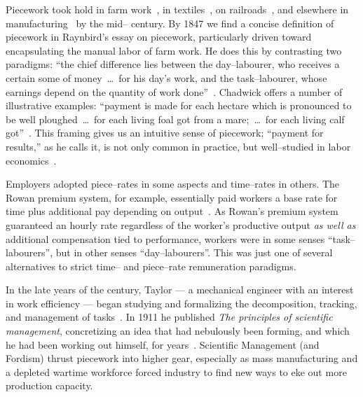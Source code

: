 \documentclass[pn4226]{subfiles}
\begin{document}
Piecework took hold in farm work~\cite{hughRaynbirdTaskWork}, %
in textiles~\cite{restructuringPieceworkBaker,riisOtherSideLives},
on railroads~\cite{Brown01041990}, and 
elsewhere in manufacturing~\cite{10.2307/3827491} by the mid-- century.
By 1847 we find
a concise definition of piecework
in Raynbird's essay on piecework,
particularly driven toward encapsulating the manual labor of farm work.
He does this by contrasting two paradigms:
``the chief difference lies between the day--labourer,
who receives a certain some of money~\dots~for his day's work,
and the task--labourer, whose earnings depend on the quantity of work done''~\cite{hughRaynbirdTaskWork}.
Chadwick offers a number of illustrative examples:
``payment is made for each hectare which is pronounced to be well ploughed~\dots~for each living foal got from a mare;~\dots~for each living calf got''~\cite{10.2307/2338394}.
This framing gives us an intuitive sense of piecework;
``payment for results,'' as he calls it,
is not only common in practice, but
well--studied in labor economics~\cite{Figlio2007901,weitzman1976new,10.2307/3003414,BJIR:BJIR038}.

Employers adopted piece--rates in some aspects and
time--rates in others.
The Rowan premium system, for example,
essentially paid workers
a base rate for time plus
additional pay depending on output~\cite{rowan1901premium}.
As Rowan's premium system guaranteed an hourly rate
regardless of the worker's productive output
\textit{as well as} additional compensation tied to performance,
workers were
in some senses ``task--labourers'', but
in other senses ``day--labourers''.
This was just one of several alternatives to strict time-- and piece--rate remuneration paradigms.

In the late years of the  century, Taylor
--- a mechanical engineer with an interest in work efficiency ---
began studying and formalizing the decomposition, tracking, and management of tasks~\cite{taylor1896piece}.
In 1911 he published \textit{The principles of scientific management},
concretizing an idea that had nebulously been forming,
and which he had been working out himself, for years~\cite{taylor1914principles}.
Scientific Management (and Fordism) thrust piecework into higher gear, especially as
mass manufacturing and
a depleted wartime workforce forced industry to find new ways to eke out more production capacity.
\end{document}
